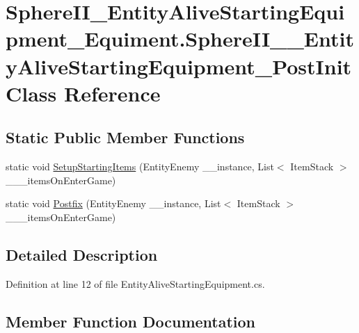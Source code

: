\hypertarget{class_sphere_i_i___entity_alive_starting_equipment___equiment_1_1_sphere_i_i_____entity_alive_starting_equipment___post_init}{}\section{Sphere\+I\+I\+\_\+\+Entity\+Alive\+Starting\+Equipment\+\_\+\+Equiment.\+Sphere\+I\+I\+\_\+\+\_\+\+Entity\+Alive\+Starting\+Equipment\+\_\+\+Post\+Init Class Reference}
\label{class_sphere_i_i___entity_alive_starting_equipment___equiment_1_1_sphere_i_i_____entity_alive_starting_equipment___post_init}
\subsection*{Static Public Member Functions}
\begin{DoxyCompactItemize}
\item 
static void \mbox{\hyperlink{class_sphere_i_i___entity_alive_starting_equipment___equiment_1_1_sphere_i_i_____entity_alive_starting_equipment___post_init_a2b3725e0c5ce3bcd7d2fb9220718828b}{Setup\+Starting\+Items}} (Entity\+Enemy \+\_\+\+\_\+instance, List$<$ Item\+Stack $>$ \+\_\+\+\_\+\+\_\+items\+On\+Enter\+Game)
\item 
static void \mbox{\hyperlink{class_sphere_i_i___entity_alive_starting_equipment___equiment_1_1_sphere_i_i_____entity_alive_starting_equipment___post_init_a9b34291319f5ab265c99ee180c6eb52d}{Postfix}} (Entity\+Enemy \+\_\+\+\_\+instance, List$<$ Item\+Stack $>$ \+\_\+\+\_\+\+\_\+items\+On\+Enter\+Game)
\end{DoxyCompactItemize}


\subsection{Detailed Description}


Definition at line 12 of file Entity\+Alive\+Starting\+Equipment.\+cs.



\subsection{Member Function Documentation}
\mbox{\label{class_sphere_i_i___entity_alive_starting_equipment___equiment_1_1_sphere_i_i_____entity_alive_starting_equipment___post_init_a9b34291319f5ab265c99ee180c6eb52d}} 
